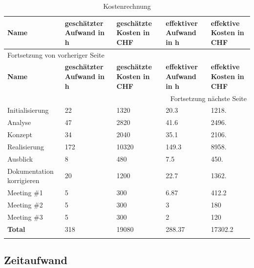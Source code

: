 \begin{longtable}{|l|p{2.5cm}|p{2.5cm}|p{2.5cm}|p{2.5cm}|}
\hline
\textbf{Name}\cellcolor[HTML]{C0C0C0} & \textbf{geschätzter Aufwand in h}\cellcolor[HTML]{C0C0C0} & \textbf{geschätzte Kosten in CHF}\cellcolor[HTML]{C0C0C0} & \textbf{effektiver Aufwand in h}\cellcolor[HTML]{C0C0C0} & \textbf{effektive Kosten in CHF}\cellcolor[HTML]{C0C0C0}\\
\hline
\endfirsthead
\multicolumn{5}{l}{Fortsetzung von vorheriger Seite} \\
\hline

\textbf{Name}\cellcolor[HTML]{C0C0C0} & \textbf{geschätzter Aufwand in h}\cellcolor[HTML]{C0C0C0} & \textbf{geschätzte Kosten in CHF}\cellcolor[HTML]{C0C0C0} & \textbf{effektiver Aufwand in h}\cellcolor[HTML]{C0C0C0} & \textbf{effektive Kosten in CHF}\cellcolor[HTML]{C0C0C0} \\

\hline
\endhead
\hline\multicolumn{5}{r}{Fortsetzung nächste Seite} \\
\endfoot
\endlastfoot
\hline
Initialisierung & 22 & 1320 & 20.3 & 1218.\\
Analyse & 47 & 2820 & 41.6 & 2496.\\
Konzept & 34 & 2040 & 35.1 & 2106.\\
Realisierung & 172 & 10320 & 149.3 & 8958.\\
Ausblick & 8 & 480 & 7.5 & 450.\\
Dokumentation korrigieren & 20 & 1200 & 22.7 & 1362.\\
Meeting \#1 & 5 & 300 & 6.87 & 412.2\\
Meeting \#2 & 5 & 300 & 3 & 180\\
Meeting \#3 & 5 & 300 & 2 & 120\\
\hline
\textbf{Total} & 318 & 19080 & 288.37 & 17302.2\\
\hline
\caption{\label{tab:orgc5c17d7}
Kostenrechnung}
\\
\end{longtable}

\subsection{Zeitaufwand}
\label{sec:org60e1849}

